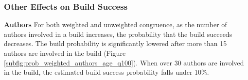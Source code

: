 


\subsubsection{Other Effects on Build Success}
\label{sec:effectauthors}

\indent\indent
\textbf{Authors} For both weighted and unweighted congruence, as the number of authors involved in a build increases, the probability that the build succeeds decreases. The build probability is significantly lowered after more than 15 authors are involved in the build (Figure \ref{subfig:prob_weighted_authors_age_q100}). When over 30 authors are involved in the build, the estimated build success probability falls under 10\%.

